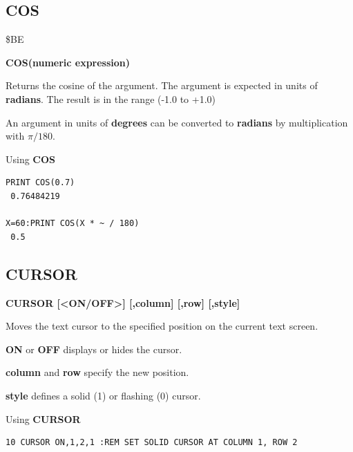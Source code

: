 
\newpage
\subsection{COS}
\begin{description}[leftmargin=2cm,style=nextline]
\item [Token:] \$BE
\item [Format:] {\bf COS(numeric expression)}
\item [Usage:] Returns the cosine of the argument.
               The argument is expected in units of {\bf radians}.
               The result is in the range (-1.0 to +1.0)

\item [Remarks:] An argument in units of {\bf degrees}
                 can be converted to {\bf radians}
               by multiplication with $\pi/180$.
\item [Examples:] Using {\bf COS}
\begin{tcolorbox}[colback=black,coltext=white]
\verbatimfont{\codefont}
\begin{verbatim}
PRINT COS(0.7)
 0.76484219

X=60:PRINT COS(X * ~ / 180)
 0.5
\end{verbatim}
\end{tcolorbox}
\end{description}


\newpage
\subsection{CURSOR}
\begin{description}[leftmargin=2cm,style=nextline]
\item [Format:] {\bf CURSOR [<ON/OFF>] [,column] [,row] [,style]}
\item [Usage:] Moves the text cursor to
               the specified position on the current text screen.

               {\bf ON} or {\bf OFF} displays or hides the cursor.

               {\bf column} and {\bf row} specify the new position.

               {\bf style} defines a solid (1) or flashing (0) cursor.

\item [Example:] Using {\bf CURSOR}
\begin{tcolorbox}[colback=black,coltext=white]
\verbatimfont{\codefont}
\begin{verbatim}
10 CURSOR ON,1,2,1 :REM SET SOLID CURSOR AT COLUMN 1, ROW 2
\end{verbatim}
\end{tcolorbox}
\end{description}

